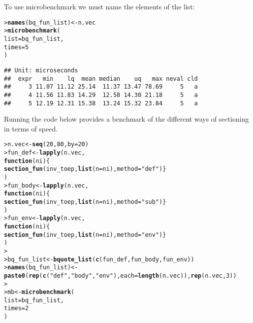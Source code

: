 \documentclass[11pt]{article}\usepackage[]{graphicx}\usepackage[]{xcolor}
\makeatletter
\newcommand{\hlnum}[1]{\textcolor[rgb]{0.686,0.059,0.569}{#1}}%
\newcommand{\hlstr}[1]{\textcolor[rgb]{0.192,0.494,0.8}{#1}}%
\newcommand{\hlstd}[1]{\textcolor[rgb]{0.345,0.345,0.345}{#1}}%
\newcommand{\hlkwa}[1]{\textcolor[rgb]{0.161,0.373,0.58}{\textbf{#1}}}%
\newcommand{\hlkwb}[1]{\textcolor[rgb]{0.69,0.353,0.396}{#1}}%
\newcommand{\hlkwc}[1]{\textcolor[rgb]{0.333,0.667,0.333}{#1}}%
\newcommand{\hlkwd}[1]{\textcolor[rgb]{0.737,0.353,0.396}{\textbf{#1}}}%
\newenvironment{kframe}{%
 \def\at@end@of@kframe{}%
 \ifinner\ifhmode%
  \def\at@end@of@kframe{\end{minipage}}%
  \begin{minipage}{\columnwidth}%
 \fi\fi%
 \def\FrameCommand##1{\hskip\@totalleftmargin \hskip-\fboxsep
 \colorbox{shadecolor}{##1}\hskip-\fboxsep
     \hskip-\linewidth \hskip-\@totalleftmargin \hskip\columnwidth}%
 \MakeFramed {\advance\hsize-\width
   \@totalleftmargin\z@ \linewidth\hsize
   \@setminipage}}%
 {\par\unskip\endMakeFramed%
 \at@end@of@kframe}
\newenvironment{knitrout}{}{} %
\makeatother
\begin{document}
To use microbenchmark we must name the elements of the list:
\begin{knitrout}
\color{fgcolor}\begin{kframe}
\begin{alltt}
\hlstd{> }\hlkwd{names}\hlstd{(bq_fun_list)} \hlkwb{<-} \hlstd{n.vec}
\hlstd{> }\hlkwd{microbenchmark}\hlstd{(}
\hlstd{  }  \hlkwc{list}  \hlstd{= bq_fun_list,}
\hlstd{  }  \hlkwc{times} \hlstd{=} \hlnum{5}
\hlstd{  }\hlstd{)}
\end{alltt}
\begin{verbatim}
## Unit: microseconds
##  expr   min    lq  mean median    uq   max neval cld
##     3 11.07 11.12 25.14  11.37 13.47 78.69     5   a
##     4 11.56 11.83 14.29  12.58 14.30 21.18     5   a
##     5 12.19 12.31 15.38  13.24 15.32 23.84     5   a
\end{verbatim}
\end{kframe}
\end{knitrout}


Running the code below provides a benchmark of the different ways of sectioning in terms of speed.

\begin{knitrout}
\color{fgcolor}\begin{kframe}
\begin{alltt}
\hlstd{> }\hlstd{n.vec}  \hlkwb{<-} \hlkwd{seq}\hlstd{(}\hlnum{20}\hlstd{,} \hlnum{80}\hlstd{,} \hlkwc{by}\hlstd{=}\hlnum{20}\hlstd{)}
\hlstd{> }\hlstd{fun_def} \hlkwb{<-} \hlkwd{lapply}\hlstd{(n.vec,}
\hlstd{  }                  \hlkwa{function}\hlstd{(}\hlkwc{ni}\hlstd{)\{}
\hlstd{  }                      \hlkwd{section_fun}\hlstd{(inv_toep,} \hlkwd{list}\hlstd{(}\hlkwc{n}\hlstd{=ni),} \hlkwc{method}\hlstd{=}\hlstr{"def"}\hlstd{)\}}
\hlstd{  }                  \hlstd{)}
\hlstd{> }\hlstd{fun_body} \hlkwb{<-} \hlkwd{lapply}\hlstd{(n.vec,}
\hlstd{  }                  \hlkwa{function}\hlstd{(}\hlkwc{ni}\hlstd{)\{}
\hlstd{  }                      \hlkwd{section_fun}\hlstd{(inv_toep,} \hlkwd{list}\hlstd{(}\hlkwc{n}\hlstd{=ni),} \hlkwc{method}\hlstd{=}\hlstr{"sub"}\hlstd{)\}}
\hlstd{  }                  \hlstd{)}
\hlstd{> }\hlstd{fun_env} \hlkwb{<-} \hlkwd{lapply}\hlstd{(n.vec,}
\hlstd{  }                  \hlkwa{function}\hlstd{(}\hlkwc{ni}\hlstd{)\{}
\hlstd{  }                      \hlkwd{section_fun}\hlstd{(inv_toep,} \hlkwd{list}\hlstd{(}\hlkwc{n}\hlstd{=ni),} \hlkwc{method}\hlstd{=}\hlstr{"env"}\hlstd{)\}}
\hlstd{  }                  \hlstd{)}
\hlstd{> }
\hlstd{> }\hlstd{bq_fun_list} \hlkwb{<-} \hlkwd{bquote_list}\hlstd{(}\hlkwd{c}\hlstd{(fun_def, fun_body, fun_env))}
\hlstd{> }\hlkwd{names}\hlstd{(bq_fun_list)} \hlkwb{<-} \hlkwd{paste0}\hlstd{(}\hlkwd{rep}\hlstd{(}\hlkwd{c}\hlstd{(}\hlstr{"def"}\hlstd{,} \hlstr{"body"}\hlstd{,} \hlstr{"env"}\hlstd{),} \hlkwc{each}\hlstd{=}\hlkwd{length}\hlstd{(n.vec)),} \hlkwd{rep}\hlstd{(n.vec,} \hlnum{3}\hlstd{))}
\hlstd{> }
\hlstd{> }\hlstd{mb} \hlkwb{<-} \hlkwd{microbenchmark}\hlstd{(}
\hlstd{  }  \hlkwc{list}  \hlstd{= bq_fun_list,}
\hlstd{  }  \hlkwc{times} \hlstd{=} \hlnum{2}
\hlstd{  }\hlstd{)}
\end{alltt}
\end{kframe}
\end{knitrout}
\end{document}
